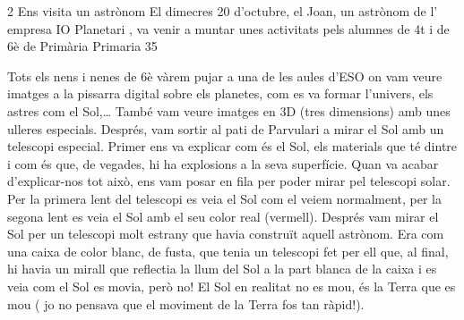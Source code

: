 \begin{news}
{2} %
{Ens visita un astrònom}
{El dimecres 20 d’octubre, el Joan,  un astrònom  de l’ empresa IO Planetari , va venir a muntar unes activitats pels alumnes de 4t i de 6è de Primària}
{Primaria}
{35} %

\noindent{}

Tots els nens i nenes de 6è vàrem pujar a una de les aules d’ESO on vam veure imatges a la pissarra digital sobre els planetes, com es va formar l’univers, els astres com el Sol,… També vam veure imatges en 3D (tres dimensions) amb unes ulleres especials. Després, vam sortir al pati de Parvulari a mirar el Sol amb un telescopi especial. Primer ens va explicar com és el Sol, els materials que té  dintre i com és que, de vegades, hi ha explosions a la seva superfície. Quan va acabar d’explicar-nos tot això, ens vam posar en fila per poder mirar pel telescopi solar. Per la primera lent del telescopi es veia el Sol com el veiem normalment, per la segona lent es veia el Sol amb el seu color real (vermell). Després vam mirar el Sol per un telescopi molt estrany que havia construït aquell astrònom. Era com una caixa de color blanc, de fusta, que tenia un telescopi  fet per ell que, al final,  hi havia un mirall que reflectia la llum del Sol a la part blanca de la caixa i es veia com el Sol es movia, però no!  El Sol en realitat no es mou, és la Terra que es mou ( jo no pensava que el moviment de la Terra fos tan ràpid!). 


\end{news}

